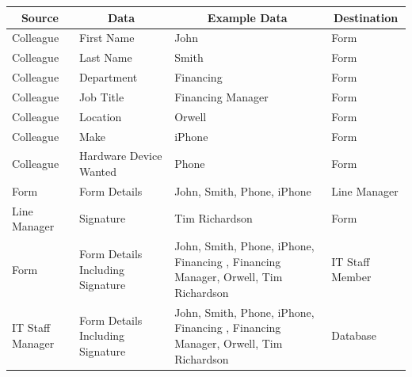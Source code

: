 \begin{longtable}{|p{3cm}|p{3cm}|p{3cm}|p{3cm}|}
\hline
\multicolumn{1}{|c|}{\textbf{Source}} & \multicolumn{1}{c|}{\textbf{Data}} & \multicolumn{1}{c|}{\textbf{Example Data}}         & \multicolumn{1}{c|}{\textbf{Destination}} \\ \hline
Colleague                             & First Name                         & John                                               & Form                                      \\ \hline
Colleague                             & Last Name                          & Smith                                              & Form                                      \\ \hline
Colleague                             & Department                              & Financing                                            & Form                                      \\ \hline
Colleague                             & Job Title                              & Financing Manager                                          & Form                                      \\ \hline
Colleague                             & Location                              & Orwell                                            & Form                                      \\ \hline
Colleague                             & Make                              & iPhone                                             & Form                                      \\ \hline
Colleague                             & Hardware Device Wanted             & Phone                                              & Form                                      \\ \hline
Form                                  & Form Details                       & John, Smith, Phone, iPhone                & Line Manager                              \\ \hline
Line Manager                          & Signature                          & Tim Richardson                                     & Form                                      \\ \hline
Form                                  & Form Details Including Signature   & John, Smith, Phone, iPhone, Financing , Financing Manager, Orwell, Tim Richardson & IT Staff Member                           \\ \hline
IT Staff Manager                      & Form Details Including Signature   & John, Smith, Phone, iPhone, Financing , Financing Manager, Orwell, Tim Richardson & Database                                  \\ \hline

\end{longtable}
